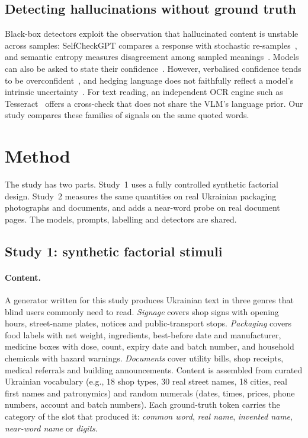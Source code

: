 \documentclass[pdflatex,sn-mathphys-num]{sn-jnl}%
\theoremstyle{thmstyleone}%
\theoremstyle{thmstyletwo}%
\theoremstyle{thmstylethree}%
\begin{document}
\subsection{Detecting hallucinations without ground truth}

Black-box detectors exploit the observation that hallucinated content is unstable across samples: SelfCheckGPT compares a response with stochastic re-samples~\cite{manakul2023selfcheckgpt}, and semantic entropy measures disagreement among sampled meanings~\cite{kuhn2023semantic,farquhar2024detecting}. Models can also be asked to state their confidence~\cite{lin2022teaching,kadavath2022language}. However, verbalised confidence tends to be overconfident~\cite{xiong2023can}, and hedging language does not faithfully reflect a model's intrinsic uncertainty~\cite{yona2024can}. For text reading, an independent OCR engine such as Tesseract~\cite{smith2007overview} offers a cross-check that does not share the VLM's language prior. Our study compares these families of signals on the same quoted words.


\section{Method}\label{sec:method}

The study has two parts. Study~1 uses a fully controlled synthetic factorial design. Study~2 measures the same quantities on real Ukrainian packaging photographs and documents, and adds a near-word probe on real document pages. The models, prompts, labelling and detectors are shared.

\subsection{Study 1: synthetic factorial stimuli}\label{sec:synth}

\paragraph{Content.} A generator written for this study produces Ukrainian text in three genres that blind users commonly need to read. \emph{Signage} covers shop signs with opening hours, street-name plates, notices and public-transport stops. \emph{Packaging} covers food labels with net weight, ingredients, best-before date and manufacturer, medicine boxes with dose, count, expiry date and batch number, and household chemicals with hazard warnings. \emph{Documents} cover utility bills, shop receipts, medical referrals and building announcements. Content is assembled from curated Ukrainian vocabulary (e.g., 18 shop types, 30 real street names, 18 cities, real first names and patronymics) and random numerals (dates, times, prices, phone numbers, account and batch numbers). Each ground-truth token carries the category of the slot that produced it: \emph{common word}, \emph{real name}, \emph{invented name}, \emph{near-word name} or \emph{digits}.
\end{document}
